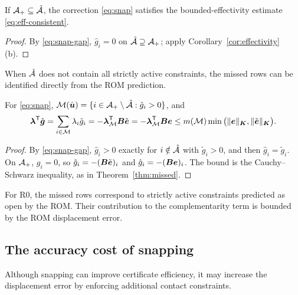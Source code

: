 \begin{proposition}\label{prop:snap}
If $\mathcal{A}_{+}\subseteq\hat{\mathcal{A}}$, the correction \eqref{eq:snap} satisfies the bounded-effectivity estimate \eqref{eq:eff-consistent}.
\end{proposition}
\begin{proof}
By \eqref{eq:snap-gap}, $\hat g_i=0$ on $\hat{\mathcal{A}}\supseteq\mathcal{A}_{+}$; apply Corollary~\ref{cor:effectivity}(b).
\end{proof}

When $\hat{\mathcal{A}}$ does not contain all strictly active constraints, the missed rows can be identified directly from the ROM prediction.

\begin{corollary}\label{cor:snap-missed}
For \eqref{eq:snap}, $\mathcal{M}(\hat{\boldsymbol{u}})=\{i\in\mathcal{A}_{+}\setminus\hat{\mathcal{A}}:\tilde g_i>0\}$, and
\begin{equation}\label{eq:snap-missed}
  \boldsymbol{\lambda}^{\mathsf{T}}\hat{\boldsymbol{g}}=\sum_{i\in\mathcal{M}}\lambda_i\tilde g_i=-\boldsymbol{\lambda}_{\mathcal{M}}^{\mathsf{T}}\boldsymbol{B}\tilde{\boldsymbol{e}}=-\boldsymbol{\lambda}_{\mathcal{M}}^{\mathsf{T}}\boldsymbol{B}\boldsymbol{e}\le m(\mathcal{M})\min\big(\lVert \boldsymbol{e} \rVert_{\boldsymbol{K}},\lVert \tilde{\boldsymbol{e}} \rVert_{\boldsymbol{K}}\big).
\end{equation}
\end{corollary}
\begin{proof}
By \eqref{eq:snap-gap}, $\hat g_i>0$ exactly for $i\notin\hat{\mathcal{A}}$ with $\tilde g_i>0$, and then $\hat g_i=\tilde g_i$. On $\mathcal{A}_{+}$, $g_i=0$, so
$\tilde g_i=-(\boldsymbol{B}\tilde{\boldsymbol{e}})_i$ and $\hat g_i=-(\boldsymbol{B}\boldsymbol{e})_i$. The bound is the Cauchy--Schwarz inequality, as in Theorem~\ref{thm:missed}.
\end{proof}

For R0, the missed rows correspond to strictly active constraints predicted as open by the ROM. Their contribution to the complementarity term is bounded by the ROM displacement error.

\subsection{The accuracy cost of snapping}

Although snapping can improve certificate efficiency, it may increase the displacement error by enforcing additional contact constraints.


